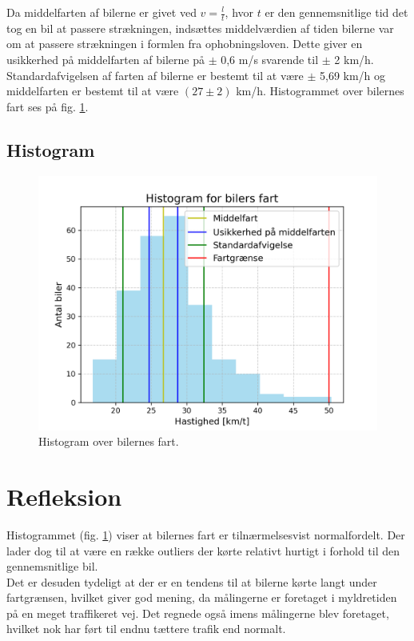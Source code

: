 \documentclass[hidelinks]{article}
\begin{document}
Da middelfarten af bilerne er givet ved $v = \frac{l}{t}$, hvor $t$ er den gennemsnitlige tid det tog en bil at passere strækningen, indsættes middelværdien af tiden bilerne var om at passere strækningen i formlen fra ophobningsloven. Dette giver en usikkerhed på middelfarten af bilerne på $\pm$ 0,6 m/s svarende til $\pm$ 2 km/h.\\

Standardafvigelsen af farten af bilerne er bestemt til at være $\pm$ 5,69 km/h og middelfarten er bestemt til at være $(27 \pm 2)$ km/h. Histogrammet over bilernes fart ses på fig. \ref{fig:histogram}. \\

\subsection{Histogram}

\begin{figure}[H]
    \centering
    \includegraphics[width = 0.75 \textwidth]{img/histogram.png}
    \caption{Histogram over bilernes fart.}
    \label{fig:histogram}
\end{figure}

\section{Refleksion}

Histogrammet (fig. \ref{fig:histogram}) viser at bilernes fart er tilnærmelsesvist normalfordelt. Der lader dog til at være en række outliers der kørte relativt hurtigt i forhold til den gennemsnitlige bil.\\

Det er desuden tydeligt at der er en tendens til at bilerne kørte langt under fartgrænsen, hvilket giver god mening, da målingerne er foretaget i myldretiden på en meget traffikeret vej. Det regnede også imens målingerne blev foretaget, hvilket nok har ført til endnu tættere trafik end normalt.\\
\end{document}

